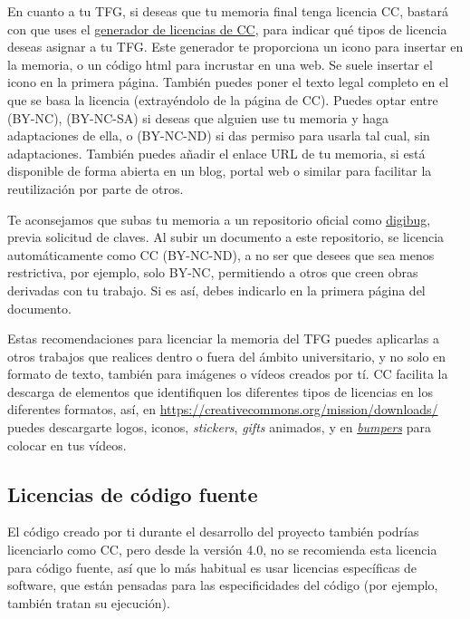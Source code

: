  
En cuanto a tu TFG, si deseas que tu memoria final tenga licencia CC, bastará con que uses el \href{https://chooser-beta.creativecommons.org/}{generador de licencias de CC}, para indicar qué tipos de licencia deseas asignar a tu TFG. Este generador te proporciona un icono para insertar en la memoria, o un código html para incrustar en una web. Se suele insertar el icono en la primera página. También puedes poner el texto legal completo en el que se basa la licencia (extrayéndolo de la página de CC). Puedes optar entre (BY-NC), (BY-NC-SA) si deseas que alguien use tu memoria y haga adaptaciones de ella, o (BY-NC-ND) si das permiso para usarla tal cual, sin adaptaciones. También puedes añadir el enlace URL de tu memoria, si está disponible de forma abierta en un blog, portal web o similar para facilitar la reutilización por parte de otros. 

Te aconsejamos que subas tu memoria a un repositorio oficial como \href{https://digibug.ugr.es/password-login}{digibug}, previa solicitud de claves. Al subir un documento a este repositorio, se licencia automáticamente como CC (BY-NC-ND), a no ser que desees que sea menos restrictiva, por ejemplo, solo BY-NC, permitiendo a otros que creen obras derivadas con tu trabajo. Si es así, debes indicarlo en la primera página del documento. 

Estas recomendaciones para licenciar la memoria del TFG puedes aplicarlas a otros trabajos que realices dentro o fuera del ámbito universitario, y no solo en formato de texto, también para imágenes o vídeos creados por tí. CC facilita la descarga de elementos que identifiquen los diferentes tipos de licencias en los diferentes formatos, así, en \url{https://creativecommons.org/mission/downloads/} puedes descargarte logos, iconos, \textit{stickers}, \textit{gifts} animados, y en \href{https://wiki.creativecommons.org/wiki/CC_video_bumpers}{\textit{bumpers}} para colocar en tus vídeos.

\subsection{Licencias de código fuente}

El código creado por ti durante el desarrollo del proyecto también podrías licenciarlo como CC, pero desde la versión 4.0, no se recomienda esta licencia para código fuente, así que lo más habitual es usar licencias específicas de software, que están pensadas para las especificidades del código (por ejemplo, también tratan su  ejecución). 

